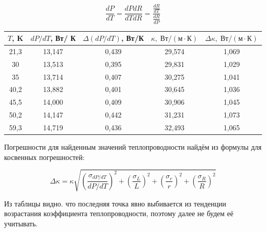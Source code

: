 \documentclass[a4paper, 12pt]{article} %
\begin{document}
\begin{equation}
    \frac{dP}{dT} = \frac{dP dR}{dT dR} = \frac{\frac{dR}{dT}}{\frac{dR}{dP}}
\end{equation}

\begin{center}
\begin{tabular}{|c|c|c|c|c|}
\hline
$T$, K & $dP/dT$, Вт/ К & $\Delta \left( dP/dT \right)$, Вт/К & $\kappa, \; \text{Вт}/(\text{м} \cdot \text{К})$ & $\Delta \kappa, \; \text{Вт}/(\text{м} \cdot \text{К})$ \\ \hline
21,3   & 13,147        & 0,439                               & 29,574 & 1,069                                                  \\ \hline
30     & 13,513         & 0,395                               & 29,831                                           & 1,029 \\ \hline
35     & 13,714         & 0,407                               & 30,275                                           & 1,041                                          \\ \hline
40,2   & 13,882         & 0,401                               & 30,645 & 1,036                                                  \\ \hline
45,5   & 14,000         & 0,409                               & 30,906                                           & 1,045                                                  \\ \hline
50,2   & 14,147        & 0,442                               & 31,231 & 1,073                                                  \\ \hline
59,3   & 14,719         & 0,436                               & 32,493                                           & 1,065                                                  \\ \hline
\end{tabular}
\end{center}

Погрешности для найденным значений теплопроводности найдём из формулы для косвенных погрешностей:

\begin{equation}
    \Delta \kappa = \kappa \sqrt{ \left( \frac{\sigma_{dP/dT}}{dP/dT} \right)^2 + \left( \frac{\sigma_{L}}{L} \right)^2 + \left( \frac{\sigma_{r}}{r} \right)^2 + \left( \frac{\sigma_{R}}{R} \right)^2}
\end{equation}

Из таблицы видно. что последняя точка явно выбивается из тенденции возрастания коэффициента теплопроводности, поэтому далее не будем её учитывать.
\end{document}
